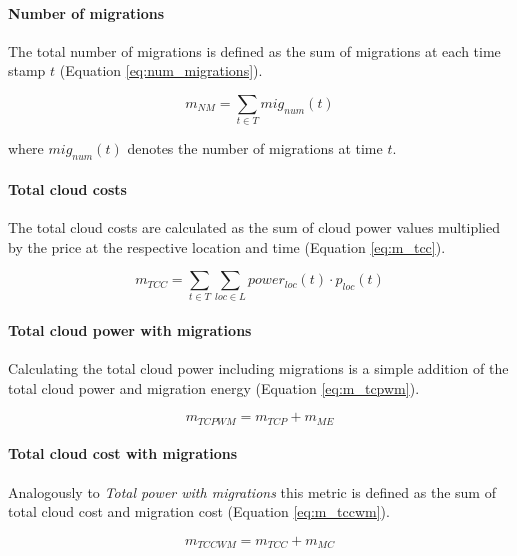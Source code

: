 \paragraph{Number of migrations}

The total number of migrations is defined as the sum of migrations at each time stamp $t$ (Equation \ref{eq:num_migrations}). 

\begin{equation}
	m_{NM} = \sum_{t \in T} mig_{num} (t) 
\label{eq:num_migrations}
\end{equation}

where $mig_{num}(t)$ denotes the number of migrations at time $t$. 


\paragraph{Total cloud costs}

The total cloud costs are calculated as the sum of cloud power values multiplied by the price at the respective location and time (Equation \ref{eq:m_tcc}). 

\begin{equation}
	m_{TCC} = \sum_{t \in T} \sum_{loc \in L } power_{loc}(t) \cdot p_{loc}(t)
\label{eq:m_tcc}
\end{equation}

\paragraph{Total cloud power with migrations}

Calculating the total cloud power including migrations is a simple addition of the total cloud power and migration energy (Equation \ref{eq:m_tcpwm}). 

\begin{equation}
	m_{TCPWM} = m_{TCP} + m_{ME}
\label{eq:m_tcpwm}
\end{equation}

\paragraph{Total cloud cost with migrations}

Analogously to \textit{Total power with migrations} this metric is defined as the sum of total cloud cost and migration cost (Equation \ref{eq:m_tccwm}). 

\begin{equation}
	m_{TCCWM} = m_{TCC} + m_{MC}
\label{eq:m_tccwm}
\end{equation}

